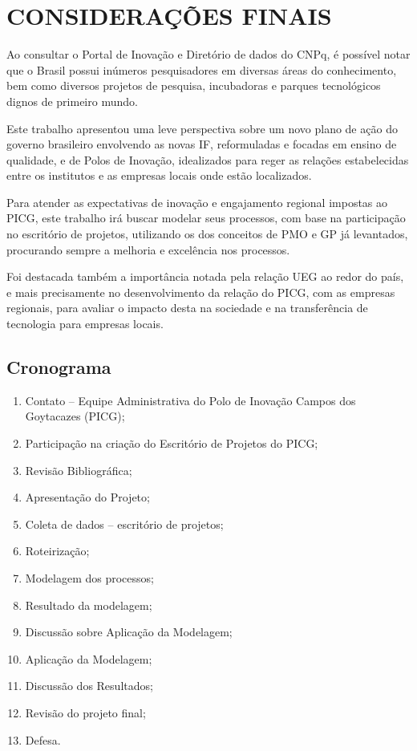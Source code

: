\chapter{CONSIDERAÇÕES FINAIS}
\thispagestyle{empty}

Ao consultar o Portal de Inovação e Diretório de dados do CNPq, é possível notar que o Brasil possui inúmeros pesquisadores em diversas áreas do conhecimento, bem como diversos projetos de pesquisa, incubadoras e parques tecnológicos dignos de primeiro mundo.

Este trabalho apresentou uma leve perspectiva sobre um novo plano de ação do governo brasileiro envolvendo as novas IF, reformuladas e focadas em ensino de qualidade, e de Polos de Inovação, idealizados para reger as relações estabelecidas entre os institutos e as empresas locais onde estão localizados.

Para atender as expectativas de inovação e engajamento regional impostas ao PICG, este trabalho irá buscar modelar seus processos, com base na participação no escritório de projetos, utilizando os dos conceitos de PMO e GP já levantados, procurando sempre a melhoria e excelência nos processos.

Foi destacada também a importância notada pela relação UEG ao redor do país, e mais precisamente no desenvolvimento da relação do PICG, com as empresas regionais, para avaliar o impacto desta na sociedade e na transferência de tecnologia para empresas locais.

\newpage
\thispagestyle{empty}
\section{Cronograma}

\begin{enumerate}
  \item{Contato – Equipe Administrativa do Polo de Inovação Campos dos Goytacazes (PICG);}
  \item{Participação na criação do Escritório de Projetos do PICG;}
  \item{Revisão Bibliográfica;}
  \item{Apresentação do Projeto;}
  \item{Coleta de dados – escritório de projetos;}
  \item{Roteirização;}
  \item{Modelagem dos processos;}
  \item{Resultado da modelagem;}
  \item{Discussão sobre Aplicação da Modelagem;}
  \item{Aplicação da Modelagem;}
  \item{Discussão dos Resultados;}
  \item{Revisão do projeto final;}
  \item{Defesa.}
\end{enumerate}

